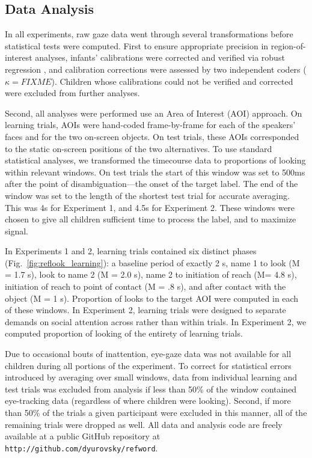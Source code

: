 \documentclass{pnastwo}
\begin{document}
\begin{article}
\begin{materials}
\subsection{Data Analysis}

In all experiments, raw gaze data went through several transformations before statistical tests were computed. First to ensure appropriate precision in region-of-interest analyses, infants' calibrations were corrected and verified via robust regression \cite[described in][]{frank2012}, and calibration corrections were assessed by two independent coders ($\kappa = FIXME$). Children whose calibrations could not be verified and corrected were excluded from further analyses.

Second, all analyses were performed use an Area of Interest (AOI) approach. On learning trials, AOIs were hand-coded frame-by-frame for each of the speakers' faces and for the two on-screen objects. On test trials, these AOIs corresponded to the static on-screen positions of the two alternatives. To use standard statistical analyses, we transformed the timecourse data to proportions of looking within relevant windows. On test trials the start of this window was set to 500ms after the point of disambiguation---the onset of the target label. The end of the window was set to the length of the shortest test trial for accurate averaging. This was 4s for Experiment 1, and 4.5s for Experiment 2. These windows were chosen to give all children sufficient time to process the label, and to maximize signal.

In Experiments 1 and 2, learning trials contained six distinct phases (Fig.~\ref{fig:reflook_learning}): a baseline period of exactly 2 s, name 1 to look (M = 1.7 s), look to name 2 (M = 2.0 s), name 2 to initiation of reach (M= 4.8 s), initiation of reach to point of contact (M = .8 s), and after contact with the object (M = 1 s). Proportion of looks to the target AOI were computed in each of these windows. In Experiment 2, learning trials were designed to separate demands on social attention across rather than within trials. In Experiment 2, we computed proportion of looking of the entirety of learning trials.

Due to occasional bouts of inattention, eye-gaze data was not available for all children during all portions of the experiment. To correct for statistical errors introduced by averaging over small windows,
data from individual learning and test trials was excluded from analysis if less than 50\% of the window contained eye-tracking data (regardless of where children were looking). Second, if more than 50\% of the trials a given participant were excluded in this manner, all of the remaining trials were dropped as well. All data and analysis code are freely available at a public GitHub repository at \small{\tt{http://github.com/dyurovsky/refword}}.


\end{materials}
\end{article}
\end{document}
